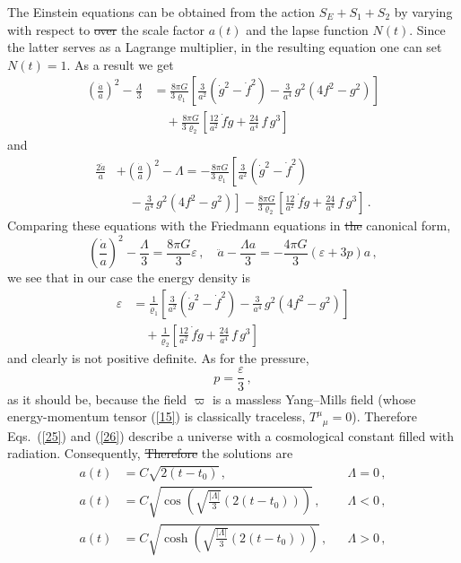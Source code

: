 \documentclass[11pt, a4paper]{article}
\newcommand{\lang}[1]{\textcolor{langfix}{#1}}
\newcommand{\subst}[1]{\textcolor{substantive}{#1}}
\newcommand{\rem}[1]{\textcolor{removeprop}{\sout{#1}}}
\begin{document}
The Einstein equations can be obtained from the action $S_E +S_1+S_2$ by varying \lang{with respect to} \rem{over} the scale factor $a(t)$ and the lapse function $N(t)$. Since the latter serves as a Lagrange multiplier, in the resulting equation one can set $N(t)=1$. As a result we get
\begin{align}
\left(\frac{\dot{a}}{a} \right)^2-\frac{\Lambda}{3}
 &=\frac{8\pi G}{3\varrho_1}\left[\frac{3}{a^2} \left(\dot g^2 - \dot f^2\right)
 -\frac{3}{a^4}\,g^2\left(4f^2-g^2\right)\right]\nonumber\\
 &\quad +\frac{8\pi G}{3\varrho_2}\left[\frac{12}{a^2}\, \dot f \dot g +\frac{24}{a^4}\,f\, g^3\right]\label{25}
\end{align}
and
\begin{align}
\frac{2\ddot a}{a} &+ \left(\frac{\dot a}{a}\right)^2 - \Lambda
 =-\frac{8\pi G}{3\varrho_1}\left[\frac{3}{a^2} \left(\dot g^2 - \dot f^2\right)\right.\nonumber\\
 &\quad -\left.\frac{3}{a^4}\,g^2\left(4f^2-g^2\right)\right]
 -\frac{8\pi G}{3\varrho_2}\left[\frac{12}{a^2}\, \dot f \dot g +\frac{24}{a^4}\,f\, g^3\right]\,.\label{26}
\end{align}
Comparing these equations with the Friedmann equations in \rem{the} canonical form,
\begin{equation}
\left(\frac{\dot{a}}{a} \right)^2-\frac{\Lambda}{3}=\frac{8\pi G}{3}\varepsilon\, , \quad \ddot a -\frac{\Lambda a}{3}=-\frac{4\pi G}{3}(\varepsilon+3p)a\,,
\end{equation}
we see that in our case the energy density is
\begin{align}
\varepsilon&= \frac{1}{\varrho_1}\left[\frac{3}{a^2} \left(\dot g^2 - \dot f^2\right)
 -\frac{3}{a^4}\,g^2\left(4f^2-g^2\right)\right]\nonumber\\
 &\quad +\frac{1}{\varrho_2}\left[\frac{12}{a^2}\, \dot f \dot g +\frac{24}{a^4}\,f\, g^3\right]\label{27}
\end{align}
and clearly is not positive definite. As for the pressure,
\begin{equation}\label{28}
p=\frac{\varepsilon}{3}\,,
\end{equation}
as it should be, because the field $\varpi$ is a massless Yang--Mills field \subst{(whose energy-momentum tensor (\ref{15}) is classically traceless, $T^\mu{}_\mu = 0$)}. Therefore Eqs.\ (\ref{25}) and (\ref{26}) describe a universe with \lang{a} cosmological constant filled with radiation. \lang{Consequently,} \rem{Therefore} the solutions are
\begin{align}
a(t)&= C \sqrt{2 (t-t_0)}\,, && \Lambda=0\,,\nonumber\\
a(t)&= C \sqrt{\cos \left(\sqrt{\frac{|\Lambda|}{3} } \left(2 (t-t_0)\right)\right)}\,, && \Lambda<0\,,\nonumber\\
a(t)&= C \sqrt{\cosh \left(\sqrt{\frac{|\Lambda|}{3} } \left(2 (t-t_0)\right)\right)}\,, && \Lambda>0\,,\label{eq:scale_sol}
\end{align}
\end{document}
